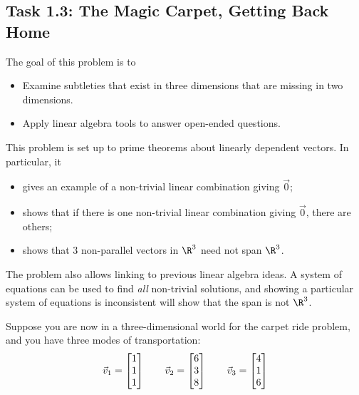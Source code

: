 \documentclass{problemset}
\begin{document}
\begin{iola}
\section*{Task 1.3: The Magic Carpet, Getting Back Home}

	\begin{annotation}
		\begin{goals}

			The goal of this problem is to
			\begin{itemize}
				\item Examine subtleties that exist in three dimensions that are
					missing in two dimensions.
				\item Apply linear algebra tools to answer open-ended questions.
			\end{itemize}
		\end{goals}

		\begin{notes}
			This problem is set up to prime
			theorems about linearly dependent vectors. In particular, it
			\begin{itemize}
				\item gives an example of a non-trivial linear combination giving $\vec 0$;
				\item shows that if there is one non-trivial linear combination giving $\vec 0$,
					there are others;
				\item shows that 3 non-parallel vectors in $\R^3$ need not span $\R^3$.
			\end{itemize}

			The problem also allows linking to previous linear algebra ideas. A system
			of equations can be used to find \emph{all} non-trivial solutions, and showing
			a particular system of equations is inconsistent will show that the span
			is not $\R^3$.
		\end{notes}
	\end{annotation}
Suppose you are now in a three-dimensional world for the carpet
ride problem, and you have three modes of transportation:
\[
	\vec v_1 = \mat{1 \\1 \\ 1}\qquad
	\vec v_2 = \mat{6 \\3 \\ 8}\qquad
	\vec v_3 = \mat{4 \\1 \\ 6}
\]


\end{iola}
\end{document}
